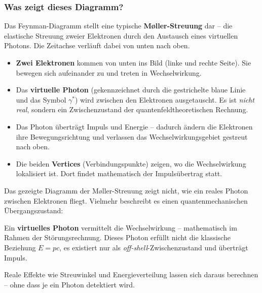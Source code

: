 \subsubsection*{Was zeigt dieses Diagramm?}
Das Feynman-Diagramm stellt eine typische \textbf{Møller-Streuung} dar – die elastische Streuung zweier Elektronen durch den Austausch eines virtuellen Photons. Die Zeitachse verläuft dabei von unten nach oben.

\begin{itemize}
	\item \textbf{Zwei Elektronen} kommen von unten ins Bild (linke und rechte Seite). Sie bewegen sich aufeinander zu und treten in Wechselwirkung.
	
	\item Das \textbf{virtuelle Photon} (gekennzeichnet durch die gestrichelte blaue Linie und das Symbol $\gamma^*$) wird zwischen den Elektronen ausgetauscht. Es ist \emph{nicht real}, sondern ein Zwischenzustand der quantenfeldtheoretischen Rechnung.
	
	\item Das Photon überträgt Impuls und Energie – dadurch ändern die Elektronen ihre Bewegungsrichtung und verlassen das Wechselwirkungsgebiet gestreut nach oben.
	
	\item Die beiden \textbf{Vertices} (Verbindungspunkte) zeigen, wo die Wechselwirkung lokalisiert ist. Dort findet mathematisch der Impulsübertrag statt.
\end{itemize}

\begin{tcolorbox}[didaktikbox, title=Was zeigt das Feynman-Diagramm wirklich?]
	\label{box:Was zeigt das Feynman-Diagramm wirklich}
	Das gezeigte Diagramm der Møller-Streuung zeigt nicht, wie ein reales Photon zwischen Elektronen fliegt. Vielmehr beschreibt es einen quantenmechanischen Übergangszustand:
	
	Ein \textbf{virtuelles Photon} vermittelt die Wechselwirkung – mathematisch im Rahmen der Störungsrechnung. Dieses Photon erfüllt nicht die klassische Beziehung $E = pc$, es existiert nur als \emph{off-shell}-Zwischenzustand und überträgt Impuls.
	
	Reale Effekte wie Streuwinkel und Energieverteilung lassen sich daraus berechnen – ohne dass je ein Photon detektiert wird.
\end{tcolorbox}

